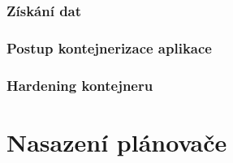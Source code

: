 \documentclass[thesis=M,czech]{FITthesis}[2019/12/23]
\theoremstyle{plain}
\theoremstyle{definition}
\begin{document}
% 

\subsubsection{Získání dat}



\subsubsection{Postup kontejnerizace aplikace}


\subsubsection{Hardening kontejneru}


\section{Nasazení plánovače}
\end{document}
